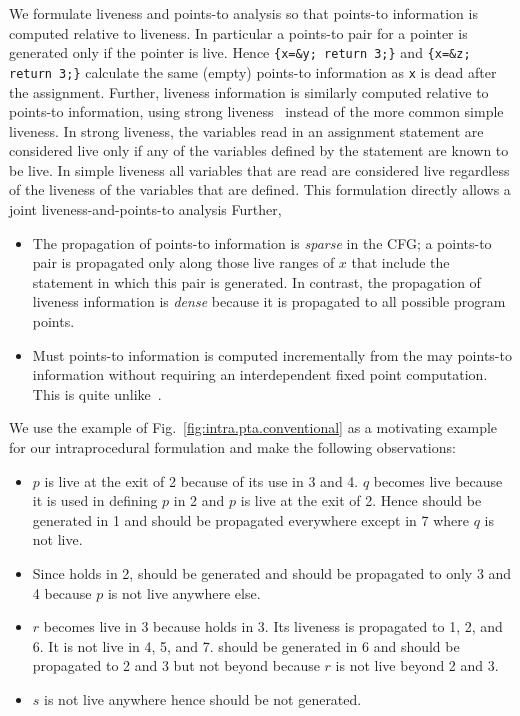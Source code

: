 \documentclass{llncs}
\newcommand{\pt}[2]{\text{$(#1,#2)$}}
\begin{document}
We formulate liveness and points-to analysis so that points-to
information is computed relative to liveness. In particular a points-to
pair for a pointer is generated only if the pointer is live. Hence
{\tt \{x=\&y; return 3;\}} and {\tt \{x=\&z; return 3;\}} calculate
the same (empty) points-to information as {\tt x} is dead after the
assignment. Further, liveness information is similarly computed relative
to points-to information, using strong
liveness~\cite{Nielson.F.Nielson.HR.Hankin.C:1998:Principles-of-Program}
instead of the more common simple liveness. In strong liveness, the
variables read in an assignment statement are considered live only if
any of the variables defined by the statement are known to be live.
In simple liveness all variables that are read are considered live
regardless of the liveness of the variables that are defined. This
formulation directly allows a joint liveness-and-points-to analysis
Further,
\begin{itemize}
\item The propagation of points-to information is {\em sparse\/} in the
      CFG; a points-to pair \pt{x}{y} is propagated only along those live
      ranges of $x$ that include the statement in which this pair is
      generated. In contrast, the propagation of liveness information
      is {\em dense\/} because it is propagated to all possible program
      points.

\item Must points-to information is computed incrementally from the may
      points-to information without requiring an interdependent fixed
      point computation. This is quite unlike~\cite{Emami.M.Ghiya.R.Hendren.LJ:1994:Context-sensitive-interprocedural-points-to,Kanade.A.Khedker.UP.Sanyal.A:2005:Heterogeneous-Fixed-Points}. 
\end{itemize}



We use the example of Fig.~\ref{fig:intra.pta.conventional} as a
motivating example for our intraprocedural formulation and make the
following observations:
\begin{itemize}
\item $p$ is live at the exit of 2 because of its use in 3 and 4. $q$
      becomes live because it is used in defining $p$ in 2 and $p$ is
      live at the exit of 2. Hence \pt{q}{r} should be generated in 1
      and should be propagated everywhere except in 7 where $q$ is not
      live.
\item Since \pt{q}{r} holds in 2, \pt{p}{r} should be generated and
      should be propagated to only 3 and 4 because $p$ is not live
      anywhere else.
\item $r$ becomes live in 3 because \pt{p}{r} holds in 3. Its liveness
      is propagated to 1, 2, and 6. It is not live in 4, 5, and 7.
      \pt{r}{s} should be generated in 6 and should be propagated to 2
      and 3 but not beyond because $r$ is not live beyond 2 and 3.
\item $s$ is not live anywhere hence \pt{s}{r} should be not generated.
\end{itemize}
\end{document}
